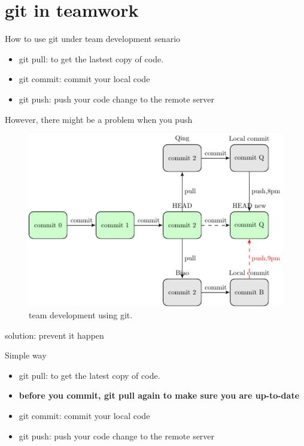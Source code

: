 \documentclass{beamer}
\begin{document}
\section{git in teamwork}
\begin{frame}{How to use git under team development senario}
    \begin{itemize}
      \item    git pull: to get the lastest copy of code.
      \item    git commit: commit your local code
      \item    git push: push your code change to the remote server
    \end{itemize}
    However, there might be a problem when you push
    \begin{figure}
      \includegraphics[width=.7\textwidth]{figures/withversioncontrolHead.pdf} 
      \caption{\label{git life cycle} team development using git.}
    \end{figure}    

\end{frame}

\begin{frame}{solution: prevent it happen}

    \begin{block}{Simple way}
      \begin{itemize}
	\item    git pull: to get the latest copy of code.
	\item    \textbf{before you commit, git pull again to make sure you are up-to-date}
	\item    git commit: commit your local code
	\item    git push: push your code change to the remote server
      \end{itemize}     
    \end{block}    
     
\end{frame}
\end{document}
